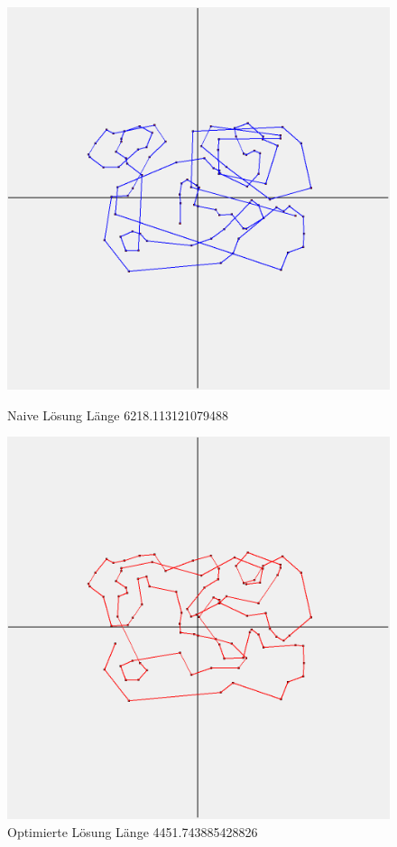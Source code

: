 \begin{figure}[t]
    \centering
    \begin{minipage}[b]{0.5\textwidth}
        \includegraphics[width=\textwidth]{naivwenigerkrumm7}
        \caption{Naive Lösung Länge 6218.113121079488}
    \end{minipage}
    \hfill
    \begin{minipage}[b]{0.5\textwidth}
        \includegraphics[width=\textwidth]{optimizedwenigerkrumm7}
        \caption{Optimierte Lösung Länge 4451.743885428826}
    \end{minipage}\label{fig:wenigerkrumm7}
\end{figure}

